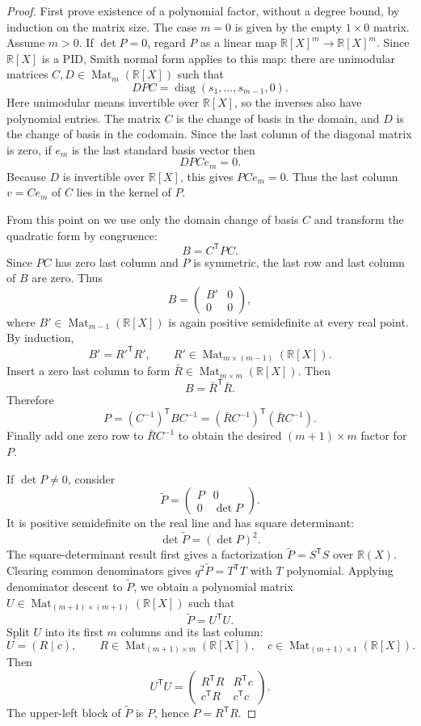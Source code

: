 \documentclass[uplatex,dvipdfmx]{jsarticle}
\newcommand{\Poly}{\mathbb{R}[X]}
\newcommand{\Frac}{\mathbb{R}(X)}
\newcommand{\Mat}{\operatorname{Mat}}
\theoremstyle{matrixsosdefinition}
\begin{document}
\begin{proof}
  First prove existence of a polynomial factor, without a degree bound,
  by induction on the matrix size.  The case \(m=0\) is given by the empty
  \(1\times0\) matrix.  Assume \(m>0\).  If \(\det P=0\), regard \(P\) as a linear map
  \(\Poly^m\to\Poly^m\). Since \(\Poly\) is a PID, Smith normal form applies to
  this map: there are unimodular matrices \(C,D\in\Mat_m(\Poly)\) such that
  \[
    DPC=\operatorname{diag}(s_1,\ldots,s_{m-1},0).
  \]
  Here unimodular means invertible over \(\Poly\), so the inverses also have
  polynomial entries.  The matrix \(C\) is the change of basis in the domain,
  and \(D\) is the change of basis in the codomain.  Since the last column of
  the diagonal matrix is zero, if \(e_m\) is the last standard basis vector then
  \[
    DPCe_m=0.
  \]
  Because \(D\) is invertible over \(\Poly\), this gives \(PCe_m=0\).  Thus the
  last column \(v=Ce_m\) of \(C\) lies in the kernel of \(P\).

  From this point on we use only the domain change of basis \(C\) and transform
  the quadratic form by congruence:
  \[
    B=C^{\mathsf T}PC.
  \]
  Since \(PC\) has zero last column and \(P\) is symmetric, the last row and
  last column of \(B\) are zero. Thus
  \[
    B=
    \begin{pmatrix}
      B'&0\\
      0&0
    \end{pmatrix},
  \]
  where \(B'\in\Mat_{m-1}(\Poly)\) is again positive semidefinite at every real
  point. By induction,
  \[
    B'=R'^{\mathsf T}R',
    \qquad R'\in\Mat_{m\times(m-1)}(\Poly).
  \]
  Insert a zero last column to form
  \(\bar R\in\Mat_{m\times m}(\Poly)\). Then
  \[
    B=\bar R^{\mathsf T}\bar R.
  \]
  Therefore
  \[
    P=(C^{-1})^{\mathsf T}BC^{-1}
      =(\bar R C^{-1})^{\mathsf T}(\bar R C^{-1}).
  \]
  Finally add one zero row to \(\bar R C^{-1}\) to obtain the desired
  \((m+1)\times m\) factor for \(P\).

  If \(\det P\ne0\), consider
  \[
    \widetilde P=
    \begin{pmatrix}
      P&0\\
      0&\det P
    \end{pmatrix}.
  \]
  It is positive semidefinite on the real line and has square determinant:
  \[
    \det\widetilde P=(\det P)^2.
  \]
  The square-determinant result first gives a factorization
  \(\widetilde P=S^{\mathsf T}S\) over \(\Frac\).  Clearing common
  denominators gives \(q^2\widetilde P=T^{\mathsf T}T\) with \(T\) polynomial.
  Applying denominator descent to \(\widetilde P\), we obtain a
  polynomial matrix \(U\in\Mat_{(m+1)\times(m+1)}(\Poly)\) such that
  \[
    \widetilde P=U^{\mathsf T}U.
  \]
  Split \(U\) into its first \(m\) columns and its last column:
  \[
    U=(R\mid c),
    \qquad
    R\in\Mat_{(m+1)\times m}(\Poly),\quad
    c\in\Mat_{(m+1)\times1}(\Poly).
  \]
  Then
  \[
    U^{\mathsf T}U=
    \begin{pmatrix}
      R^{\mathsf T}R & R^{\mathsf T}c\\
      c^{\mathsf T}R & c^{\mathsf T}c
    \end{pmatrix}.
  \]
    The upper-left block of \(\widetilde P\) is \(P\), hence \(P=R^{\mathsf T}R\).


\end{proof}
\end{document}
